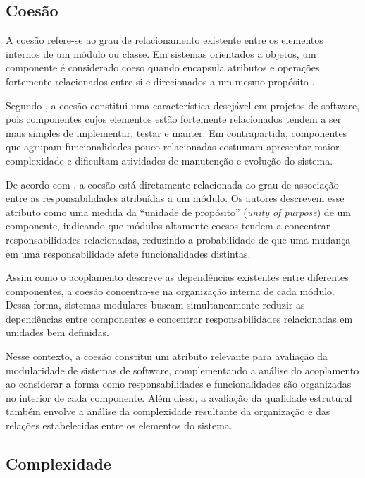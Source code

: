 \subsection{Coesão}
\label{sec:coesao}

A coesão refere-se ao grau de relacionamento existente entre os elementos internos de um módulo ou classe. Em sistemas orientados a
objetos, um componente é considerado coeso quando encapsula atributos e operações fortemente relacionados entre si e direcionados
a um mesmo propósito \cite{pressman2010}.

Segundo , a coesão constitui uma característica desejável em projetos de software, pois componentes cujos 
elementos estão fortemente relacionados tendem a ser mais simples de implementar, testar e manter. Em contrapartida, componentes que
agrupam funcionalidades pouco relacionadas costumam apresentar maior complexidade e dificultam atividades de manutenção e evolução do
sistema.

De acordo com , a coesão está diretamente relacionada ao grau de associação entre as responsabilidades atribuídas 
a um módulo. Os autores descrevem esse atributo como uma medida da ``unidade de propósito'' (\textit{unity of purpose}) de um componente, 
indicando que módulos altamente coesos tendem a concentrar responsabilidades relacionadas, reduzindo a probabilidade de que uma mudança 
em uma responsabilidade afete funcionalidades distintas.

Assim como o acoplamento descreve as dependências existentes entre diferentes componentes, a coesão concentra-se na organização interna 
de cada módulo. Dessa forma, sistemas modulares buscam simultaneamente reduzir as dependências entre componentes e concentrar responsabilidades
relacionadas em unidades bem definidas.

Nesse contexto, a coesão constitui um atributo relevante para avaliação da modularidade de sistemas de software, complementando a análise do acoplamento 
ao considerar a forma como responsabilidades e funcionalidades são organizadas no interior de cada componente. Além disso, a avaliação da qualidade estrutural 
também envolve a análise da complexidade resultante da organização e das relações estabelecidas entre os elementos do sistema.

\subsection{Complexidade}
\label{sec:complexidade}

